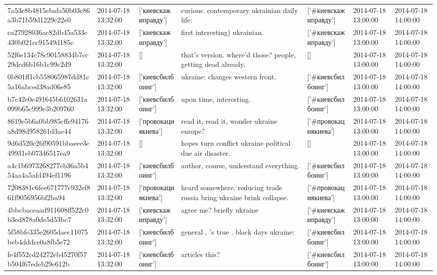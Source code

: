 \begin{tabular}{lllllll}
7a53c8b4815ebafa50b03c86a3b71b59d1229c22e0 & 2014-07-18 13:32:00 & ['киевскажиправду'] & curious. contemporary ukrainian daily life: & ['#киевскажиправду'] & 2014-07-18 13:00:00 & 2014-07-18 14:00:00 \\
ca27928036ac82db45a533c430b021cc91549d185c & 2014-07-18 13:32:00 & ['киевскажиправду'] & first interesting) ukrainian. & ['#киевскажиправду'] & 2014-07-18 13:00:00 & 2014-07-18 14:00:00 \\
52f6e134c78c90158834b7cc29dcd6b16b1c99c2d9 & 2014-07-18 13:32:00 & [] & that's version. where'd those? people, getting dead already. & [] & 2014-07-18 13:00:00 & 2014-07-18 14:00:00 \\
0b801ff1cb558065987dd81c5a16abced38ad06e85 & 2014-07-18 13:32:00 & ['киевсбилбоинг'] & ukraine: changes western front. & ['#киевсбилбоинг'] & 2014-07-18 13:00:00 & 2014-07-18 14:00:00 \\
b7c42e0e491645b6102631a099b65c999e3b209760 & 2014-07-18 13:32:00 & ['киевсбилбоинг'] & upon time, interesting. & ['#киевсбилбоинг'] & 2014-07-18 13:00:00 & 2014-07-18 14:00:00 \\
8619e5b6a0bb985cffe94176a8d98d958261d3ae44 & 2014-07-18 13:32:00 & ['провокациякиева'] & read it, read it, wonder ukraine europe? & ['#провокациякиева'] & 2014-07-18 13:00:00 & 2014-07-18 14:00:00 \\
9d6d520c26f90591bbaeee3c49931eb07346517ea9 & 2014-07-18 13:32:00 & [] & hopes turn conflict ukraine political due air disaster. & [] & 2014-07-18 13:00:00 & 2014-07-18 14:00:00 \\
a4c1b6973268277eb36a5b454aa4a5afd494ef1196 & 2014-07-18 13:32:00 & ['киевсбилбоинг'] & author, course, understand everything. & ['#киевсбилбоинг'] & 2014-07-18 13:00:00 & 2014-07-18 14:00:00 \\
7208381c6fee671777c932ef861f9056956bf2ba94 & 2014-07-18 13:32:00 & ['провокациякиева'] & heard somewhere. reducing trade russia bring ukraine brink collapse. & ['#провокациякиева'] & 2014-07-18 13:00:00 & 2014-07-18 14:00:00 \\
4bbcbaceaad911608ff522c0b3ed878a0de5d53bc7 & 2014-07-18 13:32:00 & ['киевскажиправду'] & agree me? briefly ukraine & ['#киевскажиправду'] & 2014-07-18 13:00:00 & 2014-07-18 14:00:00 \\
5f58bfe335e2605daec11075beb4dddce0a8fb5e72 & 2014-07-18 13:32:00 & ['киевсбилбоинг'] & general , 's true . black days ukraine: & ['#киевсбилбоинг'] & 2014-07-18 13:00:00 & 2014-07-18 14:00:00 \\
fe4f552cd24272eb45270f57b504f67edeb29e612b & 2014-07-18 13:32:00 & ['киевсбилбоинг'] & articles this? & ['#киевсбилбоинг'] & 2014-07-18 13:00:00 & 2014-07-18 14:00:00 \\

\end{tabular}
